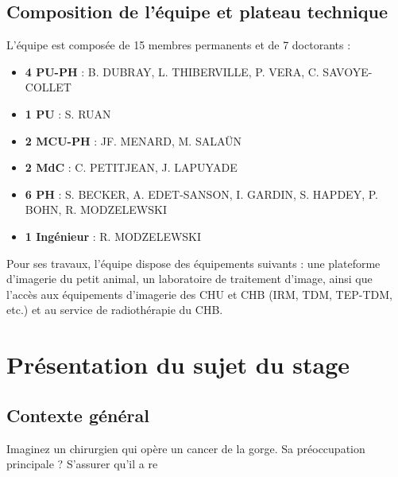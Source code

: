 \documentclass[11pt,a4paper]{report}
\begin{document}
\section{Composition de l'équipe et plateau technique}

L'équipe est composée de 15 membres permanents et de 7 doctorants :

\begin{itemize}
\item \textbf{4 PU-PH} : B. DUBRAY, L. THIBERVILLE, P. VERA, C. SAVOYE-COLLET
\item \textbf{1 PU} : S. RUAN
\item \textbf{2 MCU-PH} : JF. MENARD, M. SALAÜN
\item \textbf{2 MdC} : C. PETITJEAN, J. LAPUYADE
\item \textbf{6 PH} : S. BECKER, A. EDET-SANSON, I. GARDIN, S. HAPDEY, P. BOHN, R. MODZELEWSKI
\item \textbf{1 Ingénieur} : R. MODZELEWSKI
\end{itemize}

Pour ses travaux, l'équipe dispose des équipements suivants : une plateforme d'imagerie du petit animal, un laboratoire de traitement d'image, ainsi que l'accès aux équipements d'imagerie des CHU et CHB (IRM, TDM, TEP-TDM, etc.) et au service de radiothérapie du CHB.

\chapter{Présentation du sujet du stage}

\section{Contexte général}

Imaginez un chirurgien qui opère un cancer de la gorge. Sa préoccupation principale ? S'assurer qu'il a re
\end{document}
